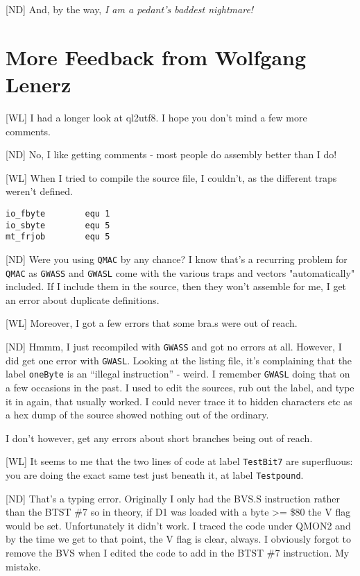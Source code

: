 [ND] And, by the way, \emph{I am a pedant's baddest nightmare!}


\section{More Feedback from Wolfgang Lenerz}


[WL] I had a longer look at ql2utf8. I hope you don't mind a few more comments.

[ND] No, I like getting comments - most people do assembly better than I do!

[WL] When I tried to compile the source file, I couldn't, as the different traps weren't defined.

\begin{lstlisting}[numbers=none]
io_fbyte        equ 1
io_sbyte        equ 5
mt_frjob        equ 5
\end{lstlisting}

[ND] Were you using \texttt{QMAC} by any chance? I know that's a recurring problem for \texttt{QMAC} as \texttt{GWASS} and \texttt{GWASL} come with the various traps and vectors "automatically" included. If I include them in the source, then they won't assemble for me, I get an error about duplicate definitions.


[WL] Moreover, I got a few errors that some bra.s  were out of reach.

[ND] Hmmm, I just recompiled with \texttt{GWASS} and got no errors at all. However, I did get one error with \texttt{GWASL}. Looking at the listing file, it's complaining that the label \texttt{oneByte} is an ``illegal instruction'' - weird. I remember \texttt{GWASL} doing that on a few occasions in the past. I used to edit the sources, rub out the label, and type it in again, that usually worked. I could never trace it to hidden characters etc as a hex dump of the source showed nothing out of the ordinary.

I don't however, get any errors about short branches being out of reach. 


[WL] It seems to me that the two lines of code at label \texttt{TestBit7} are superfluous: you are doing the exact same test just beneath it, at label \texttt{Testpound}.

[ND] That's a typing error. Originally I only had the BVS.S instruction rather than the BTST \#7 so in theory, if D1 was loaded with a byte >= \$80 the V flag would be set. Unfortunately it didn't work. I traced the code under QMON2 and by the time we get to that point, the V flag is clear, always. I obviously forgot to remove the BVS when I edited the code to add in the BTST \#7 instruction. My mistake.


